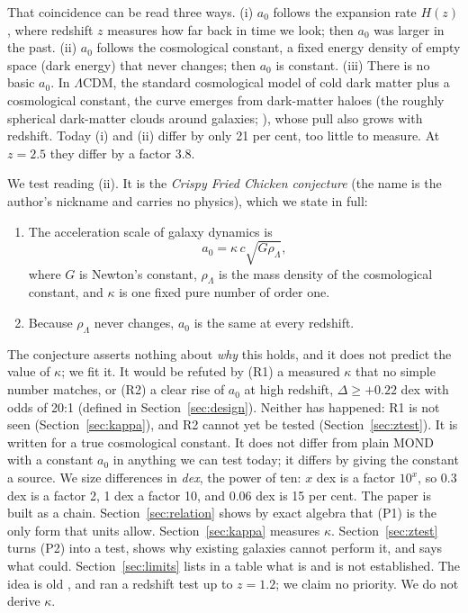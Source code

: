 \documentclass[fleqn,usenatbib]{mnras}
\begin{document}
That coincidence can be read three ways. (i) $a_0$ follows the expansion rate $H(z)$, where redshift $z$ measures how far back in time we look; then $a_0$ was larger in the past. (ii) $a_0$ follows the cosmological constant, a fixed energy density of empty space (dark energy) that never changes; then $a_0$ is constant. (iii) There is no basic $a_0$. In $\Lambda$CDM, the standard cosmological model of cold dark matter plus a cosmological constant, the curve emerges from dark-matter haloes (the roughly spherical dark-matter clouds around galaxies; \citealt{Navarro2017}), whose pull also grows with redshift. Today (i) and (ii) differ by only 21 per cent, too little to measure. At $z=2.5$ they differ by a factor 3.8.

We test reading (ii). It is the \emph{Crispy Fried Chicken conjecture} (the name is the author's nickname and carries no physics), which we state in full:
\begin{enumerate}
\item[(P1)] The acceleration scale of galaxy dynamics is
\begin{equation}
a_0=\kappa\,c\sqrt{G\rho_\Lambda},
\label{eq:relation}
\end{equation}
where $G$ is Newton's constant, $\rho_\Lambda$ is the mass density of the cosmological constant, and $\kappa$ is one fixed pure number of order one.
\item[(P2)] Because $\rho_\Lambda$ never changes, $a_0$ is the same at every redshift.
\end{enumerate}
The conjecture asserts nothing about \emph{why} this holds, and it does not predict the value of $\kappa$; we fit it. It would be refuted by (R1) a measured $\kappa$ that no simple number matches, or (R2) a clear rise of $a_0$ at high redshift, $\Delta\ge+0.22$ dex with odds of 20:1 (defined in Section~\ref{sec:design}). Neither has happened: R1 is not seen (Section~\ref{sec:kappa}), and R2 cannot yet be tested (Section~\ref{sec:ztest}). It is written for a true cosmological constant. It does not differ from plain MOND with a constant $a_0$ in anything we can test today; it differs by giving the constant a source. We size differences in \emph{dex}, the power of ten: $x$ dex is a factor $10^x$, so 0.3 dex is a factor 2, 1 dex a factor 10, and 0.06 dex is 15 per cent. The paper is built as a chain. Section~\ref{sec:relation} shows by exact algebra that (P1) is the only form that units allow. Section~\ref{sec:kappa} measures $\kappa$. Section~\ref{sec:ztest} turns (P2) into a test, shows why existing galaxies cannot perform it, and says what could. Section~\ref{sec:limits} lists in a table what is and is not established. The idea is old \citep{Milgrom1999,Milgrom2020}, and \citet{Limbach2008} ran a redshift test up to $z=1.2$; we claim no priority. We do not derive $\kappa$.
\end{document}
